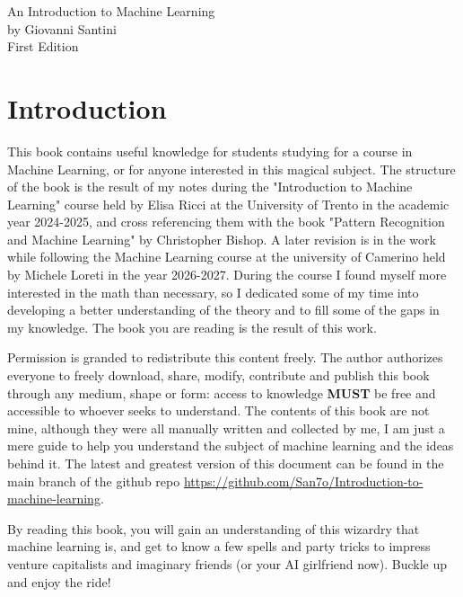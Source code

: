 \documentclass{article}
\title{}
\begin{document}
\begin{titlepage}
  \centering
  {\Huge An Introduction to Machine Learning \\}
  \vspace*{50.0pt}
  by Giovanni Santini \\
  \vspace{1.5pt}
  First Edition
\end{titlepage}
\providecommand{\tightlist}{%
  \setlength{\itemsep}{0pt}\setlength{\parskip}{0pt}}

\tableofcontents

\newpage

\section*{Introduction}

This book contains useful knowledge for students studying for a course in
Machine Learning, or for anyone interested in this magical subject. The
structure of the book is the result of my notes during the "Introduction to
Machine Learning" course held by Elisa Ricci at the University of Trento in the
academic year 2024-2025, and cross referencing them with the book "Pattern
Recognition and Machine Learning" by Christopher Bishop. A later revision is in
the work while following the Machine Learning course at the university of
Camerino held by Michele Loreti in the year 2026-2027. During the course I found
myself more interested in the math than necessary, so I dedicated some of my
time into developing a better understanding of the theory and to fill some of
the gaps in my knowledge. The book you are reading is the result of this work.

Permission is granded to redistribute this content freely. The author authorizes
everyone to freely download, share, modify, contribute and publish this book
through any medium, shape or form: access to knowledge \textbf{MUST} be free and
accessible to whoever seeks to understand. The contents of this book are not
mine, although they were all manually written and collected by me, I am just a
mere guide to help you understand the subject of machine learning and the ideas
behind it. The latest and greatest version of this document can be found in the
main branch of the github repo
\href{https://github.com/San7o/Introduction-to-machine-learning}{https://github.com/San7o/Introduction-to-machine-learning}.

By reading this book, you will gain an understanding of this wizardry that
machine learning is, and get to know a few spells and party tricks to impress
venture capitalists and imaginary friends (or your AI girlfriend now). Buckle up
and enjoy the ride!
\end{document}
